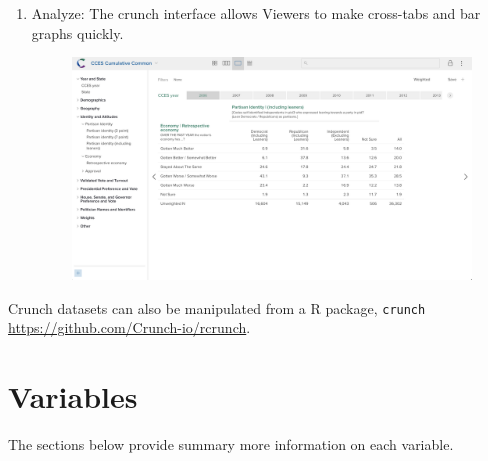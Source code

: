 \documentclass[10pt,article,oneside]{memoir}
\theoremstyle{definition}
\begin{document}
\begin{enumerate}
\def\labelenumi{\arabic{enumi}.}
\setcounter{enumi}{2}
\tightlist
\item
  Analyze: The crunch interface allows Viewers to make cross-tabs and
  bar graphs quickly.\\

  \begin{figure}[H]
  \centering
  \centerline{\includegraphics[width=1.05\linewidth]{02_crunch_tab.png}}
  \end{figure}
\end{enumerate}

Crunch datasets can also be manipulated from a R package,
\texttt{crunch} \url{https://github.com/Crunch-io/rcrunch}.

\newpage

\section{Variables}\label{variables}

The sections below provide summary more information on each variable.
\end{document}
